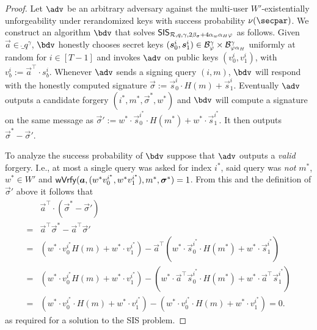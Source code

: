 \begin{proof}
  Let $\adv$ be an arbitrary adversary against the multi-user $W'$-existentially unforgeability under rerandomized keys with success probability $\nu(\secpar)$.
  We construct an algorithm $\bdv$ that solves $\mathsf{SIS}_{\mathcal{R},q,\gamma,2\beta_\sigma + 4\alpha_w\alpha_H\varphi}$ as follows.
  Given $\vec{a}\in\ring_q^\gamma$, $\bdv$ honestly chooses secret keys $(\boldsymbol{s}^i_0,\boldsymbol{s}^i_1) \in \mathcal{B}_{\varphi}^\gamma\times \mathcal{B}_{\varphi\alpha_H}^\gamma$ uniformly at random for $i\in[T-1]$ and invokes $\adv$ on public keys $(v^i_0,v^i_1)$, with $v^i_b := \vec{a}^\intercal\cdot s^i_b$.
  Whenever $\adv$ sends a signing query $(i,m)$, $\bdv$ will respond with the honestly computed signature $\vec{\sigma}:=\vec{s}^i_0\cdot H(m)+ \vec{s}^i_1$.
  Eventually $\adv$ outputs a candidate forgery $(i^*,m^*,\vec{\sigma}^*,w^*)$ and $\bdv$ will compute a signature on the same message as $\vec{\sigma}' := w^*\cdot\vec{s}^{i^*}_0\cdot H(m^*)+ w^*\cdot\vec{s}^{i^*}_1$.
  It then outputs $\vec{\sigma}^*-\vec{\sigma}'$.
  
  To analyze the success probability of $\bdv$ suppose that $\adv$ outputs a \emph{valid} forgery.
  I.e., at most a single query was asked for index $i^*$, said query was \emph{not} $m^*$, $w^*\in W'$ and $\mathsf{wVrfy}(\boldsymbol{a},(w^*v^{i^*}_0,w^*v^{i^*}_1),m^*,\allowbreak\boldsymbol{\sigma}^*)=1$.
  From this and the definition of $\vec{\sigma}'$ above it follows that
  \begin{align*}
       &\vec{a}^\intercal\cdot(\vec{\sigma}^*-\vec{\sigma}')\\ ={}& \vec{a}^\intercal\vec{\sigma}^*-\vec{a}^\intercal\vec{\sigma}'\\ 
    ={}& (w^*\cdot v^{i^*}_0 H(m) + w^*\cdot v^{i^*}_1) - \vec{a}^\intercal(w^*\cdot \vec{s}^{i^*}_0\cdot H(m^*)+ w^*\cdot\vec{s}^{i^*}_1)\\
    ={}& (w^*\cdot v^{i^*}_0 H(m) + w^*\cdot v^{i^*}_1) - (w^*\cdot\vec{a}^\intercal\vec{s}^{i^*}_0\cdot H(m^*)+ w^*\cdot\vec{a}^\intercal\vec{s}^{i^*}_1)\\
    ={}& (w^*\cdot v^{i^*}_0\cdot H(m) + w^*\cdot v^{i^*}_1) - (w^*\cdot v^{i^*}_0\cdot H(m) + w^*\cdot v^{i^*}_1) = 0.
  \end{align*}
  as required for a solution to the SIS problem.
  

\end{proof}
